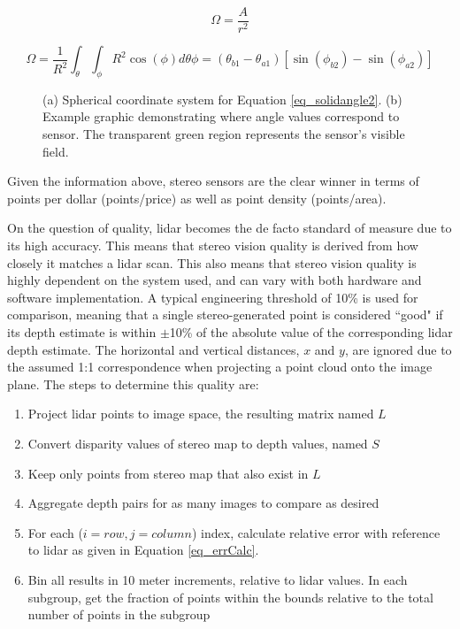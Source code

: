 \begin{equation}
\Omega = \frac{A}{r^2}
\label{eq_solidangle1}
\end{equation}

\begin{equation}
\Omega =
\frac{1}{R^2} \int_{\theta} \int_{\phi} R^2\cos(\phi) d\theta \phi =
(\theta_{b1} - \theta_{a1})[\sin(\phi_{b2}) - \sin(\phi_{a2})]
\label{eq_solidangle2}
\end{equation}

\begin{figure}[ht]
    \centering
    \caption{(a) Spherical coordinate system for Equation \ref{eq_solidangle2}. (b) Example graphic demonstrating where angle values correspond to sensor. The transparent green region represents the sensor's visible field.}
    \label{solidangle}
\end{figure}

Given the information above, stereo sensors are the clear winner in terms of points per dollar (points/price) as well as point density (points/area).

On the question of quality, lidar becomes the de facto standard of measure due to its high accuracy.
This means that stereo vision quality is derived from how closely it matches a lidar scan. This also means that stereo vision quality is highly dependent on the system used, and can vary with both hardware and software implementation. A typical engineering threshold of 10\% is used for comparison, meaning that a single stereo-generated point is considered ``good" if its depth estimate is within $\pm$10\% of the absolute value of the corresponding lidar depth estimate. The horizontal and vertical distances, $x$ and $y$, are ignored due to the assumed 1:1 correspondence when projecting a point cloud onto the image plane. The steps to determine this quality are:

\begin{enumerate} \itemsep=-0.5em
    \item Project lidar points to image space, the resulting matrix named $L$
	\item Convert disparity values of stereo map to depth values, named $S$
	\item Keep only points from stereo map that also exist in $L$
	\item Aggregate depth pairs for as many images to compare as desired
	\item For each ($i=row,j=column$) index, calculate relative error with reference to lidar as given in Equation \ref{eq_errCalc}.
	\item Bin all results in 10 meter increments, relative to lidar values. In each subgroup, get the fraction of points within the bounds relative to the total number of points in the subgroup
\end{enumerate}


